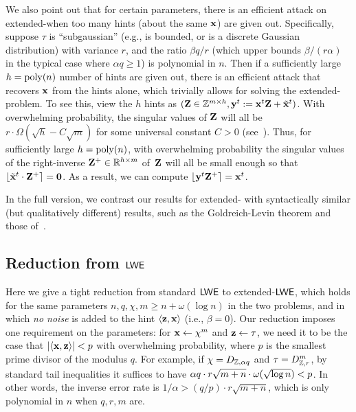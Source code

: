 We also point out that for certain parameters, there is an efficient
attack on extended-\lwe when too many hints (about the same $\mathbf{x}$)
are given out.  Specifically, suppose $\tau$ is ``subgaussian'' (e.g.,
is bounded, or is a discrete Gaussian distribution) with variance $r$,
and the ratio $\beta q/r$ (which upper bounds $\beta/(r \alpha)$ in
the typical case where $\alpha q \geq 1$) is polynomial in $n$.  Then
if a sufficiently large $h = \operatorname{poly}(n)$ number of hints are given out,
there is an efficient attack that recovers $\mathbf{x}$ from the hints
alone, which trivially allows for solving the extended-\lwe problem.
To see this, view the $h$ hints as $(\mathbf{Z} \in \mathbb{Z}^{m \times
  h},\mathbf{y}^{t} := \mathbf{x}^{t} \mathbf{Z}+\tilde{\mathbf{x}}^{t})$.  With
overwhelming probability, the singular values of $\mathbf{Z}$ will all be
$r \cdot \Omega(\sqrt{h} - C\sqrt{m})$ for some universal constant $C
> 0$ (see~\cite[Theorem
5.39]{vershynin11:_introd_to_non_asymp_analy}).  Thus, for
sufficiently large $h = \operatorname{poly}(n)$, with overwhelming probability the
singular values of the right-inverse $\mathbf{Z}^{+} \in \mathbb{R}^{h \times m}$
of~$\mathbf{Z}$ will all be small enough so that $\lfloor{\tilde{\ensuremath{\mathbf{x}}}^{t}
  \cdot \ensuremath{\mathbf{Z}}^{+}}\rceil=\mathbf{0}$.  As a result, we can compute $\lfloor{
  \ensuremath{\mathbf{y}}^{t} \ensuremath{\mathbf{Z}}^{+} }\rceil = \mathbf{x}^{t}$.

\iflncs

In the full version, we contrast our results for extended-\lwe
with syntactically similar (but qualitatively different) results, such
as the Goldreich-Levin theorem and those
of~\cite{DBLP:conf/innovations/GoldwasserKPV10,DBLP:conf/tcc/DodisGKPV10}.


\else

\fi


\subsection{Reduction from $\mathsf{LWE}$}
\label{sec:reduct-from-lwe}

Here we give a tight reduction from standard $\mathsf{LWE}$ to
extended-$\mathsf{LWE}$, which holds for the same parameters $n, q, \chi, m
\geq n+\omega(\log n)$ in the two problems, and in which \emph{no
  noise} is added to the hint $\langle{\ensuremath{\mathbf{z}}, \ensuremath{\mathbf{x}}}\rangle$ (i.e.,
$\beta=0$).  Our reduction imposes one requirement on the parameters:
for $\mathbf{x} \gets \chi^{m}$ and $\mathbf{z} \gets \tau$, we need it to be
the case that $\lvert{\langle{\ensuremath{\mathbf{x}},\ensuremath{\mathbf{z}}}\rangle}\rvert < p$ with overwhelming
probability, where $p$ is the smallest prime divisor of the modulus
$q$.  For example, if $\chi=D_{\mathbb{Z}, \alpha q}$ and $\tau=D^{m}_{\mathbb{Z},r}$,
by standard tail inequalities it suffices to have $\alpha q \cdot r
\sqrt{m+n} \cdot \omega(\sqrt{\log n}) < p$.  In other words, the \lwe inverse error
rate is $1/\alpha > (q/p) \cdot r\sqrt{m+n}$, which is only polynomial
in $n$ when $q, r, m$ are.


